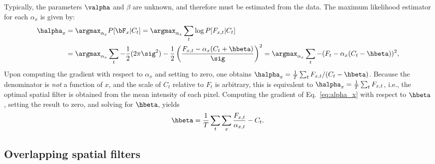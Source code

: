 Typically, the parameters  $\valpha$ and $\beta$ are unknown, and therefore must be estimated from the data.  The maximum likelihood estimator for each $\alpha_x$ is given by:
\begin{subequations}
\begin{align}
\halpha_x &= \argmax_{\alpha_x} P[\bF_x | C_t] = \argmax_{\alpha_x} \sum_t \log P[F_{x,t} | C_t] \\
&=\argmax_{\alpha_x} \sum_t -\frac{1}{2} (2\pi \sig^2) - \frac{1}{2}\left(\frac{F_{x,t} - \alpha_x (C_t + \hbeta)}{\sig}\right)^2 %
= \argmax_{\alpha_x} \sum_t - (F_t - \alpha_x(C_t - \hbeta))^2, \label{eq:alpha_x}
\end{align}
\end{subequations}
Upon computing the gradient with respect to $\alpha_x$ and setting to zero, one obtains $\halpha_x=\frac{1}{T} \sum_t F_{x,t}/(C_t-\hbeta)$.  Because the denominator is \emph{not} a function of $x$, and the scale of $C_t$ relative to $F_t$ is arbitrary, this is equivalent to $\halpha_x=\frac{1}{T} \sum_t F_{x,t}$, i.e.,  the optimal spatial filter is obtained from the mean intensity of each pixel.  Computing the gradient of Eq.~\eqref{eq:alpha_x} with respect to $\hbeta$, setting the result to zero, and solving for $\hbeta$, yields
\begin{align} \label{eq:beta}
	\hbeta = \frac{1}{T} \sum_t \sum_x \frac{F_{x,t}}{\alpha_{x,t}} - C_t.
\end{align} 


\subsection{Overlapping spatial filters} \label{sec:methods:overlapping}

